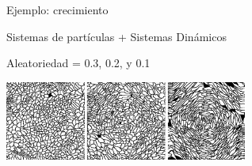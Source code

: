 \documentclass[spanish,unknownkeysallowed,10pt]{beamer}
\begin{document}
\begin{frame}{Ejemplo: crecimiento}


\end{frame}


\begin{frame}{Sistemas de partículas + Sistemas Dinámicos}

\centering
Aleatoriedad = 0.3, 0.2, y 0.1

\vspace{0.1cm}
  \includegraphics[width=8cm]{../figures/Fig3}

\end{frame}
\end{document}
